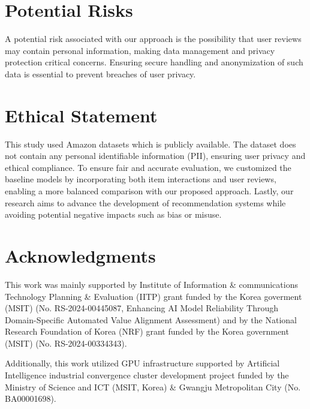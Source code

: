 \section{Potential Risks}
A potential risk associated with our approach is the possibility that user reviews may contain personal information, making data management and privacy protection critical concerns. Ensuring secure handling and anonymization of such data is essential to prevent breaches of user privacy.

\section{Ethical Statement}
This study used Amazon datasets which is publicly available. The dataset does not contain any personal identifiable information (PII), ensuring user privacy and ethical compliance. To ensure fair and accurate evaluation, we customized the baseline models by incorporating both item interactions and user reviews, enabling a more balanced comparison with our proposed approach. Lastly, our research aims to advance the development of recommendation systems while avoiding potential negative impacts such as bias or misuse.

\section*{Acknowledgments}
This work was mainly supported by Institute of Information \& communications Technology Planning \& Evaluation (IITP) grant funded by the Korea goverment (MSIT) (No. RS-2024-00445087, Enhancing AI Model Reliability Through Domain-Specific Automated Value Alignment Assessment) and by the National Research Foundation of Korea (NRF) grant funded by the Korea government (MSIT) (No. RS-2024-00334343). 

Additionally, this work utilized GPU infrastructure supported by Artificial Intelligence industrial convergence cluster development project funded by the Ministry of Science and ICT (MSIT, Korea) \& Gwangju Metropolitan City (No. BA00001698).